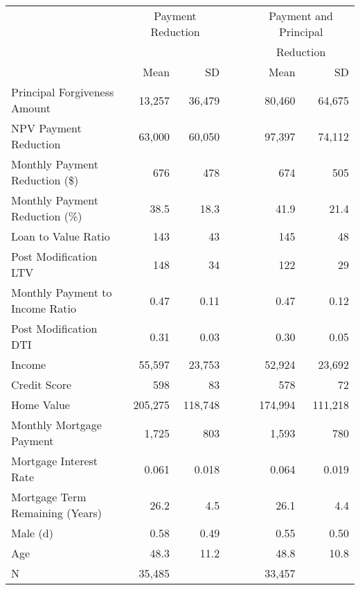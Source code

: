 \begin{tabular}{lrrllrr}
  \toprule
 \midrule
  & \multicolumn{2}{c}{Payment Reduction} & & &\multicolumn{2}{c}{Payment and Principal}\\& \multicolumn{2}{c}{} & & &\multicolumn{2}{c}{Reduction}\\& Mean & SD &&  & Mean & SD\\ \midrule
Principal Forgiveness Amount & 13,257 & 36,479 &  &  & 80,460 & 64,675 \\ 
  NPV Payment Reduction & 63,000 & 60,050 &  &  & 97,397 & 74,112 \\ 
  Monthly Payment Reduction (\$) & 676 & 478 &  &  & 674 & 505 \\ 
  Monthly Payment Reduction (\%) & 38.5 & 18.3 &  &  & 41.9 & 21.4 \\ 
  Loan to Value Ratio & 143 & 43 &  &  & 145 & 48 \\ 
  Post Modification LTV & 148 & 34 &  &  & 122 & 29 \\ 
  Monthly Payment to Income Ratio & 0.47 & 0.11 &  &  & 0.47 & 0.12 \\ 
  Post Modification DTI & 0.31 & 0.03 &  &  & 0.30 & 0.05 \\ 
  Income & 55,597 & 23,753 &  &  & 52,924 & 23,692 \\ 
  Credit Score & 598 & 83 &  &  & 578 & 72 \\ 
  Home Value & 205,275 & 118,748 &  &  & 174,994 & 111,218 \\ 
  Monthly Mortgage Payment & 1,725 & 803 &  &  & 1,593 & 780 \\ 
  Mortgage Interest Rate & 0.061 & 0.018 &  &  & 0.064 & 0.019 \\ 
  Mortgage Term Remaining (Years) & 26.2 & 4.5 &  &  & 26.1 & 4.4 \\ 
  Male (d) & 0.58 & 0.49 &  &  & 0.55 & 0.50 \\ 
  Age & 48.3 & 11.2 &  &  & 48.8 & 10.8 \\ 
   \midrule
N & 35,485 &  &  &  & 33,457 &  \\ 
   \midrule
 \bottomrule
\end{tabular}
